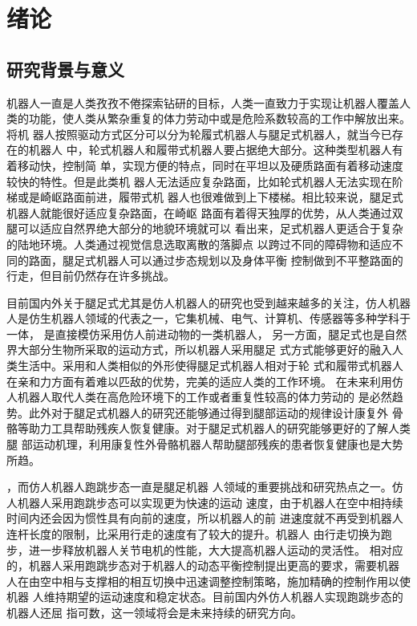 \newcommand{\aref}[1]{\autoref{#1}\space}
\renewcommand{\algorithmcfname}{算法}
\chapter{绪论}
\section{研究背景与意义}
机器人一直是人类孜孜不倦探索钻研的目标，人类一直致力于实现让机器人覆盖人
类的功能，使人类从繁杂重复的体力劳动中或是危险系数较高的工作中解放出来。将机
器人按照驱动方式区分可以分为轮履式机器人与腿足式机器人，就当今已存在的机器人
中，轮式机器人和履带式机器人要占据绝大部分。这种类型机器人有着移动快，控制简
单，实现方便的特点，同时在平坦以及硬质路面有着移动速度较快的特性。但是此类机
器人无法适应复杂路面，比如轮式机器人无法实现在阶梯或是崎岖路面前进，履带式机
器人也很难做到上下楼梯。相比较来说，腿足式机器人就能很好适应复杂路面，在崎岖
路面有着得天独厚的优势，从人类通过双腿可以适应自然界绝大部分的地貌环境就可以
看出来，足式机器人更适合于复杂的陆地环境\cite{Schraft2000ServiceR}。人类通过视觉信息选取离散的落脚点
以跨过不同的障碍物和适应不同的路面，腿足式机器人可以通过步态规划以及身体平衡
控制做到不平整路面的行走，但目前仍然存在许多挑战。

目前国内外关于腿足式尤其是仿人机器人的研究也受到越来越多的关注，仿人机器
人是仿生机器人领域的代表之一，它集机械、电气、计算机、传感器等多种学科于一体，
是直接模仿采用仿人前进动物的一类机器人\cite{梶田秀司2007仿人机器人}，
另一方面，腿足式也是自然界大部分生物所采取的运动方式，所以机器人采用腿足
式方式能够更好的融入人类生活中。采用和人类相似的外形使得腿足式机器人相对于轮
式和履带式机器人在亲和力方面有着难以匹敌的优势，完美的适应人类的工作环境\cite{2010067776.nh}。
在未来利用仿人机器人取代人类在高危险环境下的工作或者重复性较高的体力劳动的
是必然趋势。此外对于腿足式机器人的研究还能够通过得到腿部运动的规律设计康复外
骨骼等助力工具帮助残疾人恢复健康。对于腿足式机器人的研究能够更好的了解人类腿
部运动机理，利用康复性外骨骼机器人帮助腿部残疾的患者恢复健康也是大势所趋。

，而仿人机器人跑跳步态一直是腿足机器
人领域的重要挑战和研究热点之一。仿人机器人采用跑跳步态可以实现更为快速的运动
速度，由于机器人在空中相持续时间内还会因为惯性具有向前的速度，所以机器人的前
进速度就不再受到机器人连杆长度的限制，比采用行走的速度有了较大的提升。机器人
由行走切换为跑步，进一步释放机器人关节电机的性能，大大提高机器人运动的灵活性。
相对应的，机器人采用跑跳步态对于机器人的动态平衡控制提出更高的要求，需要机器
人在由空中相与支撑相的相互切换中迅速调整控制策略，施加精确的控制作用以使机器
人维持期望的运动速度和稳定状态。目前国内外仿人机器人实现跑跳步态的机器人还屈
指可数，这一领域将会是未来持续的研究方向。

